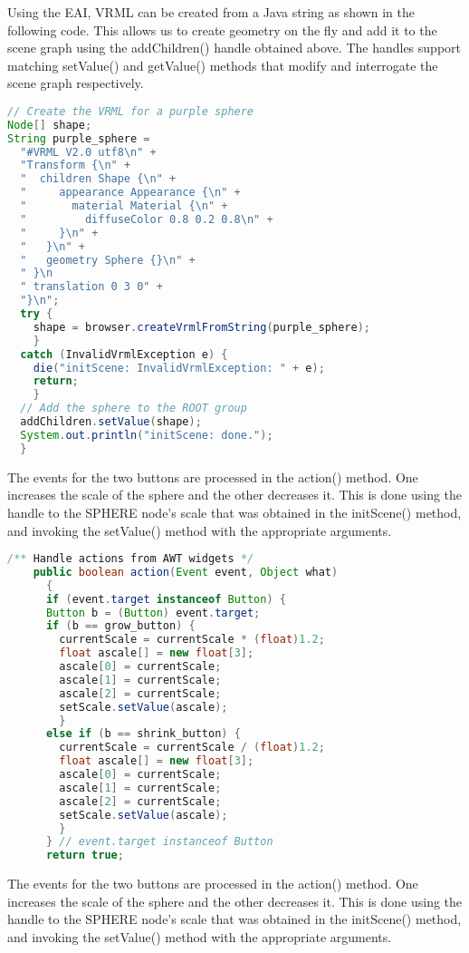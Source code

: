 Using the EAI, VRML can be created from a Java string as shown in the following code. This allows us to create geometry on the fly and add it to the scene graph using the addChildren() handle obtained above. The handles support matching setValue() and getValue() methods that modify and interrogate the scene graph respectively.

\begin{lstlisting}[language=Java, caption={}, numbers=none, frame=none]
// Create the VRML for a purple sphere
Node[] shape;
String purple_sphere =
  "#VRML V2.0 utf8\n" +
  "Transform {\n" +
  "  children Shape {\n" +
  "     appearance Appearance {\n" +
  "       material Material {\n" +
  "         diffuseColor 0.8 0.2 0.8\n" +
  "     }\n" +
  "   }\n" +
  "   geometry Sphere {}\n" +
  " }\n
  " translation 0 3 0" +
  "}\n";
  try {
    shape = browser.createVrmlFromString(purple_sphere);
    }
  catch (InvalidVrmlException e) {
    die("initScene: InvalidVrmlException: " + e);
    return;
    }
  // Add the sphere to the ROOT group
  addChildren.setValue(shape);
  System.out.println("initScene: done.");
  }
\end{lstlisting}

The events for the two buttons are processed in the action() method. One increases the scale of the sphere and the other decreases it. This is done using the handle to the SPHERE node’s scale that was obtained in the initScene() method, and invoking the setValue() method with the appropriate arguments.

\begin{lstlisting}[language=Java, caption={}, numbers=none, frame=none]
/** Handle actions from AWT widgets */
    public boolean action(Event event, Object what)
      {
      if (event.target instanceof Button) {
      Button b = (Button) event.target;
      if (b == grow_button) {
        currentScale = currentScale * (float)1.2;
        float ascale[] = new float[3];
        ascale[0] = currentScale;
        ascale[1] = currentScale;
        ascale[2] = currentScale;
        setScale.setValue(ascale);
        }
      else if (b == shrink_button) {
        currentScale = currentScale / (float)1.2;
        float ascale[] = new float[3];
        ascale[0] = currentScale;
        ascale[1] = currentScale;
        ascale[2] = currentScale;
        setScale.setValue(ascale);
        }
      } // event.target instanceof Button
      return true;
\end{lstlisting}

The events for the two buttons are processed in the action() method. One increases the scale of the sphere and the other decreases it. This is done using the handle to the SPHERE node’s scale that was obtained in the initScene() method, and invoking the setValue() method with the appropriate arguments.

